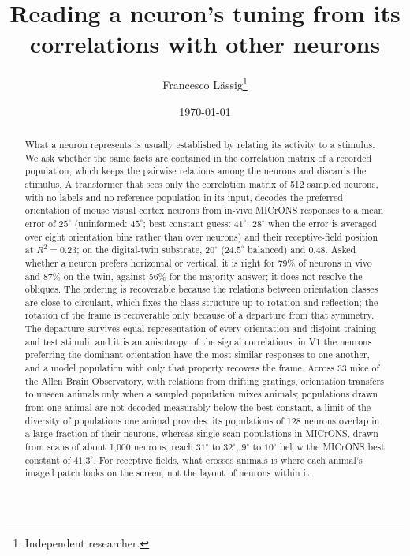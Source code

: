 \documentclass[11pt]{article}
\title{Reading a neuron's tuning from its correlations with other neurons}
\author{Francesco L\"assig\thanks{Independent researcher.}}
\date{\today}
\newcommand{\Rsq}{R^{2}}
\begin{document}
\maketitle

\begin{abstract}
What a neuron represents is usually established by relating its activity to a stimulus. We ask whether the same facts are contained in the correlation matrix of a recorded population, which keeps the pairwise relations among the neurons and discards the stimulus. A transformer that sees only the correlation matrix of 512 sampled neurons, with no labels and no reference population in its input, decodes the preferred orientation of mouse visual cortex neurons from in-vivo MICrONS responses to a mean error of $25^\circ$ (uninformed: $45^\circ$; best constant guess: $41^\circ$; $28^\circ$ when the error is averaged over eight orientation bins rather than over neurons) and their receptive-field position at $\Rsq = 0.23$; on the digital-twin substrate, $20^\circ$ ($24.5^\circ$ balanced) and 0.48. Asked whether a neuron prefers horizontal or vertical, it is right for 79\% of neurons in vivo and 87\% on the twin, against 56\% for the majority answer; it does not resolve the obliques. The ordering is recoverable because the relations between orientation classes are close to circulant, which fixes the class structure up to rotation and reflection; the rotation of the frame is recoverable only because of a departure from that symmetry. The departure survives equal representation of every orientation and disjoint training and test stimuli, and it is an anisotropy of the signal correlations: in V1 the neurons preferring the dominant orientation have the most similar responses to one another, and a model population with only that property recovers the frame. Across 33 mice of the Allen Brain Observatory, with relations from drifting gratings, orientation transfers to unseen animals only when a sampled population mixes animals; populations drawn from one animal are not decoded measurably below the best constant, a limit of the diversity of populations one animal provides: its populations of 128 neurons overlap in a large fraction of their neurons, whereas single-scan populations in MICrONS, drawn from scans of about 1,000 neurons, reach $31^\circ$ to $32^\circ$, $9^\circ$ to $10^\circ$ below the MICrONS best constant of $41.3^\circ$. For receptive fields, what crosses animals is where each animal's imaged patch looks on the screen, not the layout of neurons within it.
\end{abstract}
\end{document}
